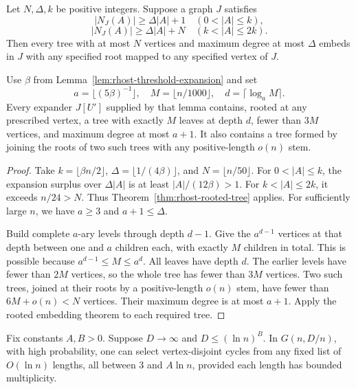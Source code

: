 \begin{theorem}\label{thm:rhost-rooted-tree}
Let $N,\Delta,k$ be positive integers.
Suppose a graph $J$ satisfies
\[
 |N_J(A)|\ge\Delta|A|+1\quad(0<|A|\le k),
\]
\[
 |N_J(A)|\ge\Delta|A|+N\quad(k<|A|\le2k).
\]
Then every tree with at most $N$ vertices and maximum degree at most $\Delta$
embeds in $J$ with any specified root mapped to any specified vertex of $J$.
\end{theorem}

\begin{lemma}\label{lem:rhost-threshold-trees}
Use $\beta$ from Lemma~\ref{lem:rhost-threshold-expansion} and set
\[
 a=\lfloor(5\beta)^{-1}\rfloor,\quad M=\lfloor n/1000\rfloor,
 \quad d=\lceil\log_a M\rceil.
\]
Every expander $J[U']$ supplied by that lemma contains, rooted at any prescribed vertex,
a tree with exactly $M$ leaves at depth $d$, fewer than $3M$ vertices, and maximum degree at most $a+1$.
It also contains a tree formed by joining the roots of two such trees with any positive-length $o(n)$ stem.
\end{lemma}

\begin{proof}
Take $k=\lfloor\beta n/2\rfloor$, $\Delta=\lfloor1/(4\beta)\rfloor$, and $N=\lfloor n/50\rfloor$.
For $0<|A|\le k$, the expansion surplus over $\Delta|A|$ is at least $|A|/(12\beta)>1$.
For $k<|A|\le2k$, it exceeds $n/24>N$.
Thus Theorem~\ref{thm:rhost-rooted-tree} applies.
For sufficiently large $n$, we have $a\ge3$ and $a+1\le\Delta$.

Build complete $a$-ary levels through depth $d-1$.
Give the $a^{d-1}$ vertices at that depth between one and $a$ children each, with exactly $M$ children in total.
This is possible because $a^{d-1}\le M\le a^d$.
All leaves have depth $d$.
The earlier levels have fewer than $2M$ vertices, so the whole tree has fewer than $3M$ vertices.
Two such trees, joined at their roots by a positive-length $o(n)$ stem, have fewer than $6M+o(n)<N$ vertices.
Their maximum degree is at most $a+1$.
Apply the rooted embedding theorem to each required tree.
\end{proof}

\begin{lemma}\label{lem:rhost-cycle-list}
Fix constants $A,B>0$.
Suppose $D\to\infty$ and $D\le(\ln n)^B$.
In $G(n,D/n)$, with high probability, one can select vertex-disjoint cycles from any fixed list of $O(\ln n)$ lengths,
all between $3$ and $A\ln n$, provided each length has bounded multiplicity.
\end{lemma}

